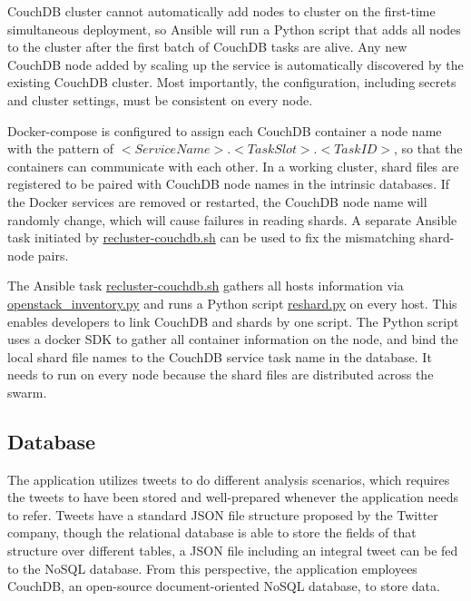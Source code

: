 CouchDB cluster cannot automatically add nodes to cluster on the first-time simultaneous deployment, so Ansible will run a Python script that adds all nodes to the cluster after the first batch of CouchDB tasks are alive. Any new CouchDB node added by scaling up the service is automatically discovered by the existing CouchDB cluster. Most importantly, the configuration, including secrets and cluster settings, must be consistent on every node.  

Docker-compose is configured to assign each CouchDB container a node name with the pattern of $<Service Name>.<Task Slot>.<Task ID>$, so that the containers can communicate with each other. In a working cluster, shard files are registered to be paired with CouchDB node names in the intrinsic databases. If the Docker services are removed or restarted, the CouchDB node name will randomly change, which will cause failures in reading shards. A separate Ansible task initiated by \href{https://bitbucket.org/comp90024team39/comp90024-a2/src/master/deployment/recluster-couchdb.sh}{recluster-couchdb.sh} can be used to fix the mismatching shard-node pairs. 

The Ansible task \href{https://bitbucket.org/comp90024team39/comp90024-a2/src/master/deployment/recluster-couchdb.sh}{recluster-couchdb.sh} gathers all hosts information via \href{https://docs.ansible.com/ansible/latest/user_guide/intro_dynamic_inventory.html}{openstack\_inventory.py} and runs a Python script \href{https://bitbucket.org/comp90024team39/comp90024-a2/src/master/deployment/files/couchdb_cluster/reshard.py}{reshard.py} on every host. This enables developers to link CouchDB and shards by one script. The Python script uses a docker SDK to gather all container information on the node, and bind the local shard file names to the CouchDB service task name in the database. It needs to run on every node because the shard files are distributed across the swarm. 

\subsection{Database}

The application utilizes tweets to do different analysis scenarios, which requires the tweets to have been stored and well-prepared whenever the application needs to refer. Tweets have a standard JSON file structure proposed by the Twitter company, though the relational database is able to store the fields of that structure over different tables, a JSON file including an integral tweet can be fed to the NoSQL database. From this perspective, the application employees CouchDB, an open-source document-oriented NoSQL database, to store data.

